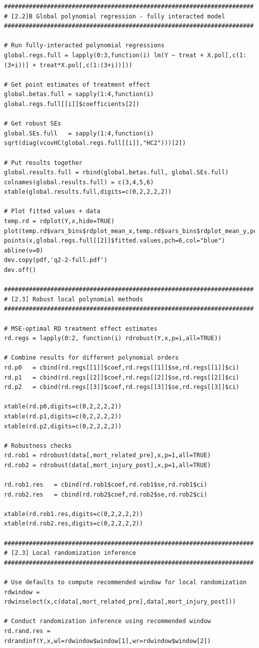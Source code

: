 \documentclass[12pt]{article}
\begin{document}
\begin{verbatim}
######################################################################
# [2.2]B Global polynomial regression - fully interacted model
######################################################################

# Run fully-interacted polynomial regressions
global.regs.full = lapply(0:3,function(i) lm(Y ~ treat + X.pol[,c(1:(3+i))] + treat*X.pol[,c(1:(3+i))]))

# Get point estimates of treatment effect
global.betas.full = sapply(1:4,function(i) global.regs.full[[i]]$coefficients[2])

# Get robust SEs
global.SEs.full   = sapply(1:4,function(i) sqrt(diag(vcovHC(global.regs.full[[i]],"HC2")))[2])

# Put results together
global.results.full = rbind(global.betas.full, global.SEs.full)
colnames(global.results.full) = c(3,4,5,6)
xtable(global.results.full,digits=c(0,2,2,2,2))

# Plot fitted values + data
temp.rd = rdplot(Y,x,hide=TRUE)
plot(temp.rd$vars_bins$rdplot_mean_x,temp.rd$vars_bins$rdplot_mean_y,pch=20,xlab="povrate60",ylab="mort_related_post")
points(x,global.regs.full[[2]]$fitted.values,pch=6,col="blue")
abline(v=0)
dev.copy(pdf,'q2-2-full.pdf')
dev.off()

######################################################################
# [2.3] Robust local polynomial methods
######################################################################

# MSE-optimal RD treatment effect estimates
rd.regs = lapply(0:2, function(i) rdrobust(Y,x,p=i,all=TRUE))

# Combine results for different polynomial orders
rd.p0   = cbind(rd.regs[[1]]$coef,rd.regs[[1]]$se,rd.regs[[1]]$ci)
rd.p1   = cbind(rd.regs[[2]]$coef,rd.regs[[2]]$se,rd.regs[[2]]$ci)
rd.p2   = cbind(rd.regs[[3]]$coef,rd.regs[[3]]$se,rd.regs[[3]]$ci)

xtable(rd.p0,digits=c(0,2,2,2,2))
xtable(rd.p1,digits=c(0,2,2,2,2))
xtable(rd.p2,digits=c(0,2,2,2,2))

# Robustness checks
rd.rob1 = rdrobust(data[,mort_related_pre],x,p=1,all=TRUE)
rd.rob2 = rdrobust(data[,mort_injury_post],x,p=1,all=TRUE)

rd.rob1.res   = cbind(rd.rob1$coef,rd.rob1$se,rd.rob1$ci)
rd.rob2.res   = cbind(rd.rob2$coef,rd.rob2$se,rd.rob2$ci)

xtable(rd.rob1.res,digits=c(0,2,2,2,2))
xtable(rd.rob2.res,digits=c(0,2,2,2,2))

######################################################################
# [2.3] Local randomization inference
######################################################################

# Use defaults to compute recommended window for local randomization
rdwindow = rdwinselect(x,c(data[,mort_related_pre],data[,mort_injury_post]))

# Conduct randomization inference using recommended window
rd.rand.res = rdrandinf(Y,x,wl=rdwindow$window[1],wr=rdwindow$window[2])

\end{verbatim}
\end{document}
